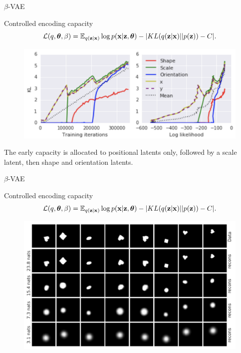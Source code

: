 \documentclass{beamer}
\begin{document}
\begin{frame}{$\beta$-VAE}
	\begin{block}{Controlled encoding capacity}
		\vspace{-0.5cm}
		\[
		\mathcal{L}(q, \boldsymbol{\theta}, \beta) = \mathbb{E}_{q(\mathbf{z} | \mathbf{x})} \log p(\mathbf{x} | \mathbf{z}, \boldsymbol{\theta}) - | KL (q(\mathbf{z} | \mathbf{x}) || p(\mathbf{z})) - C|.
		\]
	\end{block}
	\begin{figure}
		\centering
		\includegraphics[width=0.9\linewidth]{figs/betaVAE_7.png}
	\end{figure}
	The early capacity is allocated to positional latents only, followed by a scale latent, then shape and orientation latents.
	
\end{frame}
\begin{frame}{$\beta$-VAE}
	\begin{block}{Controlled encoding capacity}
		\vspace{-0.5cm}
		\[
		\mathcal{L}(q, \boldsymbol{\theta}, \beta) = \mathbb{E}_{q(\mathbf{z} | \mathbf{x})} \log p(\mathbf{x} | \mathbf{z}, \boldsymbol{\theta}) - | KL (q(\mathbf{z} | \mathbf{x}) || p(\mathbf{z})) - C|.
		\]
		\vspace{-0.5cm}
	\end{block}
	\begin{figure}
		\centering
		\includegraphics[width=0.7\linewidth]{figs/betaVAE_8.png}
	\end{figure}
	
\end{frame}
\end{document}
